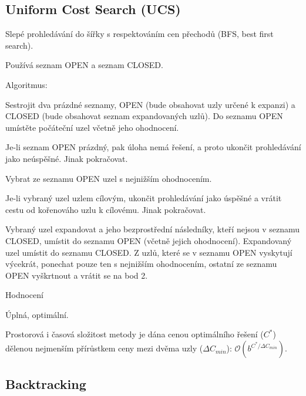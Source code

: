 \subsection{Uniform Cost Search (UCS)}

\begin{compactitem}
    \item Slepé prohledávání do šířky s respektováním cen přechodů (BFS, best first search).
    \item Používá seznam OPEN a seznam CLOSED.

    \item Algoritmus: \begin{compactenum}
        \item Sestrojit dva prázdné seznamy, OPEN (bude obsahovat uzly určené k expanzi)  a CLOSED (bude obsahovat seznam expandovaných uzlů). Do seznamu OPEN umístěte počáteční uzel včetně jeho ohodnocení.
        \item Je-li seznam OPEN prázdný, pak úloha nemá řešení, a proto ukončit prohledávání jako neúspěšné. Jinak pokračovat.
        \item Vybrat ze seznamu OPEN uzel s nejnižším ohodnocením.
        \item Je-li vybraný uzel uzlem cílovým, ukončit prohledávání jako úspěšné a vrátit cestu od kořenováho uzlu k cílovému. Jinak pokračovat.
        \item Vybraný uzel expandovat a jeho bezprostřední následníky, kteří nejsou v seznamu CLOSED, umístit do seznamu OPEN (včetně jejich ohodnocení). Expandovaný uzel umístit do seznamu CLOSED. Z uzlů, které se v seznamu OPEN vyskytují výcekrát, ponechat pouze ten s nejnižším ohodnocením, ostatní ze seznamu OPEN vyškrtnout a vrátit se na bod 2.
    \end{compactenum}

    \item Hodnocení \begin{compactitem}
        \item Úplná, optimální.
        \item Prostorová i časová složitost metody je dána cenou optimálního řešení ($C^*$) dělenou nejmenším přírůstkem ceny mezi dvěma uzly ($\Delta C_{min}$): $\mathcal{O}(b^{C^* / \Delta C_{min}})$.
    \end{compactitem}
\end{compactitem}

\subsection{Backtracking}

